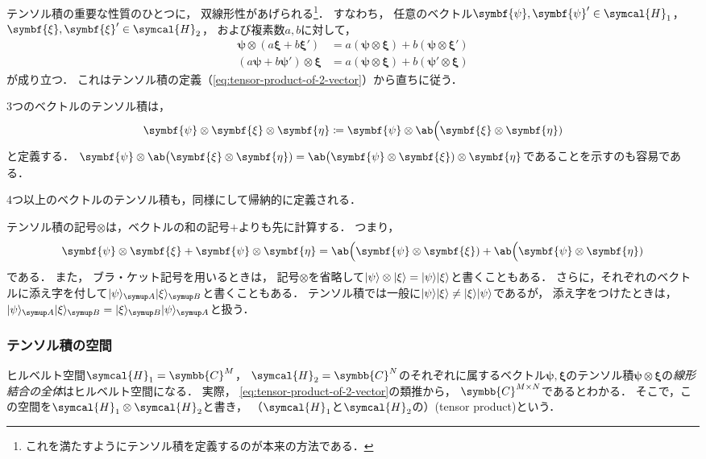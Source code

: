 \documentclass[
]{sotsu}
\newcommand{\bpsi}{\symbf{\psi}}
\newcommand{\bxi}{\symbf{\xi}}
\newcommand{\beeta}{\symbf{\eta}}
\begin{document}
\quad 
テンソル積の重要な性質のひとつに，
双線形性があげられる\footnote{
    これを満たすようにテンソル積を定義するのが本来の方法である．
}．
すなわち，
任意のベクトル$\bpsi, \bpsi' \in \symcal{H}_1$，
$\bxi, \bxi' \in \symcal{H}_2$，
および複素数$a, b$に対して，
\begin{subequations}
    \label{eq:tensor-bilinear}
    \begin{align}
        \bpsi \otimes (a \bxi + b \bxi') &= a (\bpsi \otimes \bxi) + b (\bpsi \otimes \bxi')
        \\
        (a \bpsi + b \bpsi') \otimes \bxi &= a (\bpsi \otimes \bxi) + b (\bpsi' \otimes \bxi)
    \end{align}
\end{subequations}
が成り立つ．
これはテンソル積の定義（\cref{eq:tensor-product-of-2-vector}）から直ちに従う．


\quad 
3つのベクトルのテンソル積は，
\begin{equation*}
    \bpsi \otimes \bxi \otimes \beeta
        \coloneq \bpsi \otimes \ab\Big(\bxi \otimes \beeta)
\end{equation*}
と定義する．
\(
    \bpsi \otimes \ab\big(\bxi \otimes \beeta)
    = \ab\big(\bpsi \otimes \bxi) \otimes \beeta
\)であることを示すのも容易である．

4つ以上のベクトルのテンソル積も，同様にして帰納的に定義される．


\quad 
テンソル積の記号$\otimes$は，ベクトルの和の記号$+$よりも先に計算する．
つまり，
\begin{equation*}
    \bpsi \otimes \bxi + \bpsi \otimes \beeta
    = \ab\Big(\bpsi \otimes \bxi) + \ab\Big(\bpsi \otimes \beeta)
\end{equation*}
である．
また，
ブラ・ケット記号を用いるときは，
記号$\otimes$を省略して\( 
    \ket{\psi} \otimes \ket{\xi} = \ket{\psi} \ket{\xi} 
\)と書くこともある．
さらに，それぞれのベクトルに添え字を付して\(
    \ket{\psi}<A> \ket{\xi}<B>
\)と書くこともある．
テンソル積では一般に\(
    \ket{\psi} \ket{\xi} \neq \ket{\xi} \ket{\psi}
\)であるが，
添え字をつけたときは，
\(
    \ket{\psi}<A> \ket{\xi}<B> = \ket{\xi}<B> \ket{\psi}<A>
\)と扱う．



\subsubsection{テンソル積の空間}

ヒルベルト空間$\symcal{H}_1 = \symbb{C}^M$，
$\symcal{H}_2 = \symbb{C}^N$のそれぞれに属するベクトル$\bpsi, \bxi$のテンソル積$\bpsi \otimes \bxi$の\emph{線形結合の全体}はヒルベルト空間になる．
実際，
\cref{eq:tensor-product-of-2-vector}の類推から，
$\symbb{C}^{M \times N}$であるとわかる．
そこで，この空間を$\symcal{H}_1 \otimes \symcal{H}_2$と書き，
（$\symcal{H}_1$と$\symcal{H}_2$の）(tensor product)という．
\end{document}
